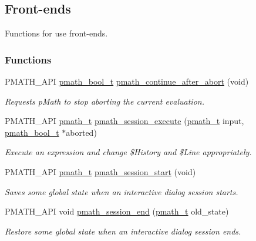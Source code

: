 \hypertarget{group__frontend}{
\subsection{Front-ends}
\label{group__frontend}
}
Functions for use front-ends.  


\subsubsection*{Functions}
\begin{CompactItemize}
\item 
PMATH\_\-API \hyperlink{group__general__types_gc92090cb0b56345d6c379ed2341d4ef4}{pmath\_\-bool\_\-t} \hyperlink{group__frontend_g4934c2dc54f852627f8b291543a21e43}{pmath\_\-continue\_\-after\_\-abort} (void)
\begin{CompactList}\small\item\em Requests pMath to stop aborting the current evaluation. \item\end{CompactList}\item 
PMATH\_\-API \hyperlink{classpmath__t}{pmath\_\-t} \hyperlink{group__frontend_g31eb5567282f8a40cab67fac2d14361c}{pmath\_\-session\_\-execute} (\hyperlink{classpmath__t}{pmath\_\-t} input, \hyperlink{group__general__types_gc92090cb0b56345d6c379ed2341d4ef4}{pmath\_\-bool\_\-t} $\ast$aborted)
\begin{CompactList}\small\item\em Execute an expression and change \$History and \$Line appropriately. \item\end{CompactList}\item 
PMATH\_\-API \hyperlink{classpmath__t}{pmath\_\-t} \hyperlink{group__frontend_ge55417d3114126529937b86befd70824}{pmath\_\-session\_\-start} (void)
\begin{CompactList}\small\item\em Saves some global state when an interactive dialog session starts. \item\end{CompactList}\item 
PMATH\_\-API void \hyperlink{group__frontend_g13649bdb13d4f8fe693f6b72bf3a0840}{pmath\_\-session\_\-end} (\hyperlink{classpmath__t}{pmath\_\-t} old\_\-state)
\begin{CompactList}\small\item\em Restore some global state when an interactive dialog session ends. \item\end{CompactList}\item 

\end{CompactItemize}
